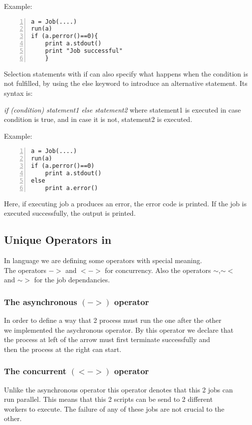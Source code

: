 Example:

\begin{Verbatim}[numbers=left]
a = Job(....)
run(a)
if (a.perror()==0){
    print a.stdout()
    print "Job successful"
    }
\end{Verbatim}
Selection statements with if can also specify what happens when the condition is not fulfilled, by using the else keyword to introduce an alternative statement. Its syntax is:

\textit{if (condition) statement1 else statement2}
where statement1 is executed in case condition is true, and in case it is not, statement2 is executed.

Example:
\begin{Verbatim}[numbers=left]
a = Job(....)
run(a)
if (a.perror()==0)
    print a.stdout()
else
    print a.error()
\end{Verbatim}

Here, if executing job a produces an error, the error code is printed. If the job is executed successfully, the output is printed.



\subsection*{Unique Operators in \lang{}}

In \lang{} language we are defining some operators with special meaning.\\
The operators $->$ and $<->$ for concurrency. Also the operators $\sim$,$\sim<$\\and $\sim>$ for the job dependancies.\\
\subsubsection*{The asynchronous $(->)$ operator}
In order to define a way that 2 process must run the one after the other\\
we implemented the asychronous operator. By this operator we declare that\\
the process at left of the arrow must first terminate successfully and\\
then the process at the right can start.
\subsubsection*{The concurrent $(<->)$ operator}
Unlike the asynchronous operator this operator denotes that this 2 jobs can\\
run parallel. This means that this 2 scripts can be send to 2 different\\
workers to execute. The failure of any of these jobs are not crucial to the\\
other.
